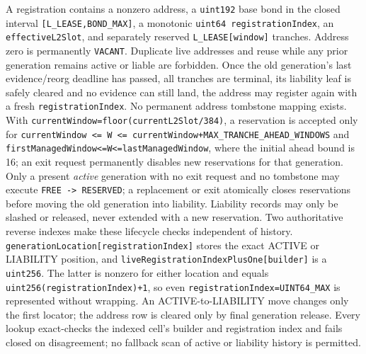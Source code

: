 \documentclass[a4paper,11pt]{article}
\newcommand{\code}[1]{\nolinkurl{#1}}
\begin{document}
A registration contains a nonzero address, a \code{uint192} base bond in the
closed interval \code{[L_LEASE,BOND_MAX]}, a monotonic
\code{uint64 registrationIndex}, an
\code{effectiveL2Slot}, and separately reserved \code{L_LEASE[window]}
tranches.  Address zero is permanently \code{VACANT}.  Duplicate live
addresses and reuse while any prior generation remains active or liable are
forbidden.  Once the old generation's last evidence/reorg deadline has passed,
all tranches are terminal, its liability leaf is safely cleared and no evidence
can still land, the address may register again with a fresh
\code{registrationIndex}.  No permanent address tombstone mapping exists.  With
\code{currentWindow=floor(currentL2Slot/384)}, a reservation is accepted only
for
\code{currentWindow <= W <= currentWindow+MAX_TRANCHE_AHEAD_WINDOWS} and
\code{firstManagedWindow<=W<=lastManagedWindow}, where the
initial ahead bound is 16; an exit request permanently disables new
reservations for that generation.  Only a present \emph{active} generation
with no exit request and no tombstone may execute \code{FREE -> RESERVED}; a
replacement or exit atomically closes reservations before moving the old
generation into liability.  Liability records may only be slashed or released,
never extended with a new reservation.
Two authoritative reverse indexes make these lifecycle checks independent of
history.  \code{generationLocation[registrationIndex]} stores the exact ACTIVE
or LIABILITY position, and
\code{liveRegistrationIndexPlusOne[builder]} is a \code{uint256}.  The latter
is nonzero for either location and equals \code{uint256(registrationIndex)+1},
so even \code{registrationIndex=UINT64_MAX} is represented without wrapping.
An ACTIVE-to-LIABILITY move changes only the first locator; the address row is
cleared only by final generation release.  Every lookup exact-checks the
indexed cell's builder and registration index and fails closed on disagreement;
no fallback scan of active or liability history is permitted.
\end{document}
